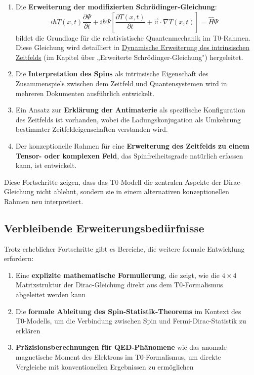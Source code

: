 \documentclass[12pt,a4paper]{article}
\newcommand{\Tfieldt}{T(x,t)}
\begin{document}
	\begin{enumerate}
		\item Die \textbf{Erweiterung der modifizierten Schrödinger-Gleichung}:
		\begin{equation}
			i\hbar \Tfieldt \frac{\partial\Psi}{\partial t} + i\hbar \Psi \left[\frac{\partial \Tfieldt}{\partial t} + \vec{v}\cdot\nabla\Tfieldt\right] = \hat{H} \Psi
		\end{equation}
		bildet die Grundlage für die relativistische Quantenmechanik im T0-Rahmen. Diese Gleichung wird detailliert in \href{https://github.com/jpascher/T0-Time-Mass-Duality/tree/main/2/pdf/English/DynamicTF-SchrodingerExtensions_En.pdf}{Dynamische Erweiterung des intrinsischen Zeitfelds} (im Kapitel über „Erweiterte Schrödinger-Gleichung") hergeleitet.
		
		\item Die \textbf{Interpretation des Spins} als intrinsische Eigenschaft des Zusammenspiels zwischen dem Zeitfeld und Quantensystemen wird in mehreren Dokumenten ausführlich entwickelt.
		
		\item Ein Ansatz zur \textbf{Erklärung der Antimaterie} als spezifische Konfiguration des Zeitfelds ist vorhanden, wobei die Ladungskonjugation als Umkehrung bestimmter Zeitfeldeigenschaften verstanden wird.
		
		\item Der konzeptionelle Rahmen für eine \textbf{Erweiterung des Zeitfelds zu einem Tensor- oder komplexen Feld}, das Spinfreiheitsgrade natürlich erfassen kann, ist entwickelt.
	\end{enumerate}
	
	Diese Fortschritte zeigen, dass das T0-Modell die zentralen Aspekte der Dirac-Gleichung nicht ablehnt, sondern sie in einem alternativen konzeptionellen Rahmen neu interpretiert.
	
	\subsection{Verbleibende Erweiterungsbedürfnisse}
	\label{subsec:dirac_extensions}
	
	Trotz erheblicher Fortschritte gibt es Bereiche, die weitere formale Entwicklung erfordern:
	
	\begin{enumerate}
		\item Eine \textbf{explizite mathematische Formulierung}, die zeigt, wie die $4 \times 4$ Matrixstruktur der Dirac-Gleichung direkt aus dem T0-Formalismus abgeleitet werden kann
		
		\item Die \textbf{formale Ableitung des Spin-Statistik-Theorems} im Kontext des T0-Modells, um die Verbindung zwischen Spin und Fermi-Dirac-Statistik zu erklären
		
		\item \textbf{Präzisionsberechnungen für QED-Phänomene} wie das anomale magnetische Moment des Elektrons im T0-Formalismus, um direkte Vergleiche mit konventionellen Ergebnissen zu ermöglichen
	\end{enumerate}
	
\end{document}

